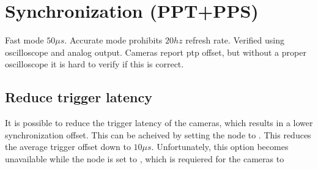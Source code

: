 \section{Synchronization (PPT+PPS)}
Fast mode \approx $50\mu s$. Accurate mode prohibits $20hz$ refresh rate.
Verified using oscilloscope and analog output.
Cameras report ptp offset, but without a proper oscilloscope it is hard to verify if this is correct.

\subsection{Reduce trigger latency}
It is possible to reduce the trigger latency of the cameras, which results in a lower synchronization offset.
This can be acheived by setting the  node to .
This reduces the average trigger offset down to $10\mu s$.
Unfortunately, this option becomes unavailable while the  node is set to , which is requiered for the cameras to


